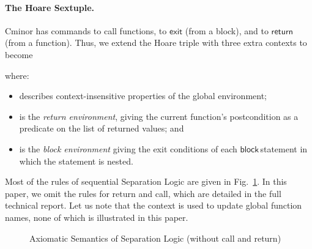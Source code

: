 \documentclass{llncs}
\newcommand{\cminor}{Cminor}
\newcommand{\tyface}[1]{\ensuremath{\mathsf{#1}}}
\newcommand{\Sassign}[2]{#1:=#2}
\newcommand{\Sstore}[3]{\tyface{[}#2\tyface{]}_{#1}\tyface{:=}#3}
\newcommand{\Sif}[3]{\tyface{if}\,#1\,\tyface{then}\,#2\,\tyface{else}\,#3}
\newcommand{\Sloop}[1]{\tyface{loop}\,#1}
\newcommand{\Sblock}[1]{\tyface{block}\,#1}
\newcommand{\Sexit}[1]{\tyface{exit}\,#1}
\newcommand{\Sseq}[2]{#1;#2}
\newcommand{\Sskip}{\tyface{skip}}
\newcommand{\st}{\sigma}
\newcommand{\semax}[6]{#1;#2;#3\vdash \{#4\}#5\{#6\}}
\newcommand{\FF}{\ensuremath{\mathrm{\mathbf{false}}}}
\newcommand{\pure}[1]{\tyface{pure}\,#1}
\newcommand{\assertmapsto}[4][]{#2\stackrel{#3}{\mapsto}_{#1}#4}
\newcommand{\assertdef}[1]{\mathsf{defined}(#1)}
\newcommand{\Bcons}[2]{#1\cdot #2}
\begin{document}
\paragraph{The Hoare Sextuple.}
\cminor{} has commands to
call functions, to \tyface{exit} (from a block), and to
\tyface{return} (from a function).  Thus, we extend the 
Hoare triple  with three extra contexts to become

where:\vspace{-7 pt}
\begin{itemize}
\item[] describes
context-insensitive properties of the global environment;
\item[]
is the \emph{return environment}, 
giving the current function's postcondition as a predicate
on the list of returned values; and 
\item[] is the
\emph{block environment} giving the exit conditions of each \Sblock statement
in which the statement  is nested.
\end{itemize}

Most of the rules of sequential Separation Logic are given
in Fig.~\ref{seq-sep-fig}. In this paper, we omit the rules for return and call, 
which are detailed in the full technical report. Let us note that the  context
is used to update global function names, none of which is illustrated in this paper.

\begin{figure}[th]
\vspace{-21pt}
\vspace{-10pt}
\caption{Axiomatic Semantics of Separation Logic (without call and return)}
\label{seq-sep-fig}
\vspace{-10pt}
\end{figure}
\end{document}
